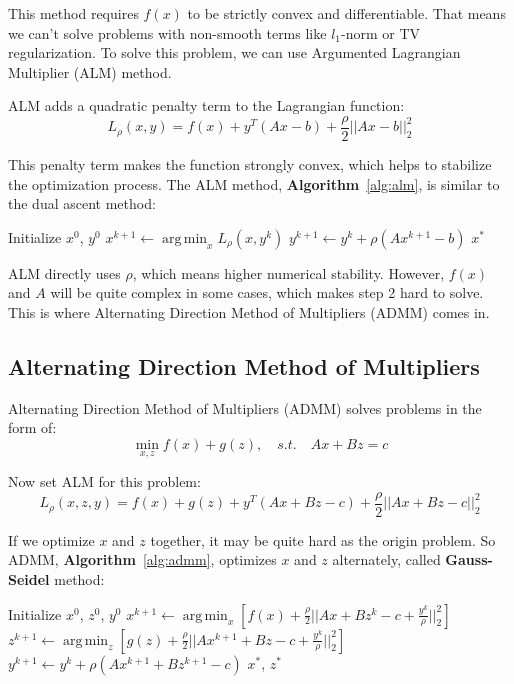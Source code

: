 \documentclass[lang=en,color=blue,mode=fancy,titlestyle=hang]{elegantbook}
\DeclareMathOperator*{\argmin}{arg\,min}
\newcommand{\algoref}[1]{\textbf{Algorithm}~\ref{#1}}
\begin{document}
This method requires $f(x)$ to be strictly convex and differentiable. That means
we can't solve problems with non-smooth terms like $l_1$-norm or TV regularization.
To solve this problem, we can use Argumented Lagrangian Multiplier (ALM) method.

ALM adds a quadratic penalty term to the Lagrangian function:
\[
  L_\rho(x, y) = f(x) + y^T (Ax - b) + \frac{\rho}{2} ||Ax - b||_2^2
\]

This penalty term makes the function strongly convex, which helps to stabilize the
optimization process. The ALM method, \algoref{alg:alm}, is similar to the dual ascent method:
\begin{algorithm}[H]
\caption{Augmented Lagrangian Multiplier}
\label{alg:alm}
\begin{algorithmic}
\State Initialize $x^0$, $y^0$
  \State $x^{k+1} \gets \argmin_x L_\rho(x, y^k)$
  \State $y^{k+1} \gets y^k + \rho (A x^{k+1} - b)$
\EndWhile
\State \Return $x^*$
\end{algorithmic}
\end{algorithm}

ALM directly uses $\rho$, which means higher numerical stability. However, $f(x)$
and $A$ will be quite complex in some cases, which makes step 2 hard to solve.
This is where Alternating Direction Method of Multipliers (ADMM) comes in.

\subsection{Alternating Direction Method of Multipliers}

Alternating Direction Method of Multipliers (ADMM) solves problems in the form of:
\[
  \min_{x,z} f(x) + g(z), \quad s.t. \quad Ax + Bz = c
\]

Now set ALM for this problem:
\[
  L_\rho(x, z, y) = f(x) + g(z) + y^T (Ax + Bz - c) + \frac{\rho}{2}
  ||Ax + Bz - c||_2^2
\]

If we optimize $x$ and $z$ together, it may be quite hard as the origin problem.
So ADMM, \algoref{alg:admm}, optimizes $x$ and $z$ alternately, called \textbf{Gauss-Seidel} method:
\begin{algorithm}[H]
\caption{Alternating Direction Method of Multipliers}
\label{alg:admm}
\begin{algorithmic}
\State Initialize $x^0$, $z^0$, $y^0$
  \State $x^{k+1} \gets \argmin_x \left[ f(x) + \frac{\rho}{2} ||Ax + Bz^k - c + \frac{y^k}{\rho}||_2^2 \right]$
  \State $z^{k+1} \gets \argmin_z \left[ g(z) + \frac{\rho}{2} ||Ax^{k+1} + Bz - c + \frac{y^k}{\rho}||_2^2 \right]$
  \State $y^{k+1} \gets y^k + \rho (Ax^{k+1} + Bz^{k+1} - c)$
\EndWhile
\State \Return $x^*$, $z^*$
\end{algorithmic}
\end{algorithm}
\end{document}

